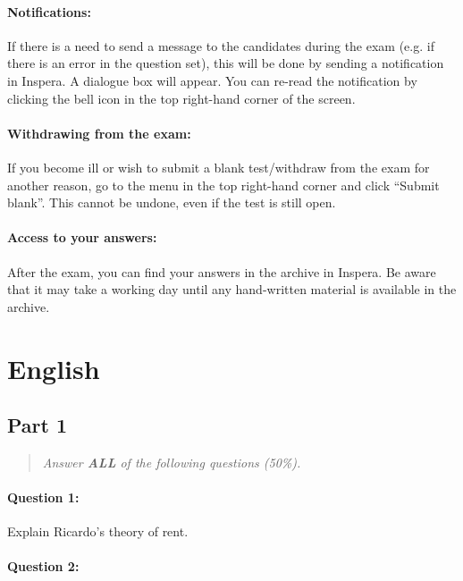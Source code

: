 \documentclass[a4paper,12pt,fleqn]{article}
\begin{document}
\paragraph{\textbf{Notifications:}} If there is a need to send a message to the
candidates during the exam (e.g. if there is an error in the question set), this
will be done by sending a notification in Inspera. A dialogue box will appear.
You can re-read the notification by clicking the bell icon in the top right-hand
corner of the screen.

\paragraph{\textbf{Withdrawing from the exam:}} If you become ill or wish to
submit a blank test/withdraw from the exam for another reason, go to the menu in
the top right-hand corner and click “Submit blank”. This cannot be undone, even
if the test is still open. 

\paragraph{\textbf{Access to your answers:}} After the exam, you can find your
answers in the archive in Inspera. Be aware that it may take a working day until
any hand-written material is available in the archive.


\clearpage

\section*{English}
\subsection*{Part 1}
\begin{quote}
\textit{Answer \textbf{ALL} of the following questions (50\%).}
\end{quote}

\paragraph{\textbf{Question 1:}}

Explain Ricardo's theory of rent.

\paragraph{\textbf{Question 2:}}
\end{document}

